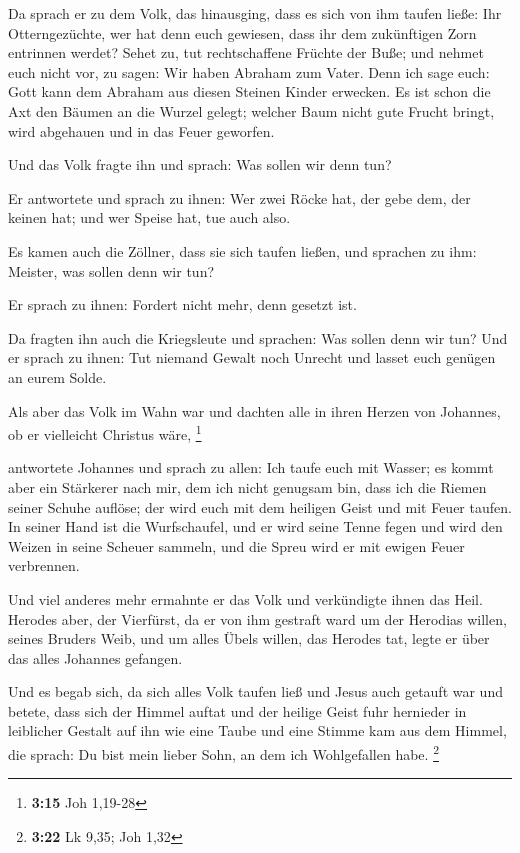  Da sprach er zu dem Volk, das hinausging, dass es sich
von ihm taufen ließe: Ihr Otterngezüchte, wer hat denn euch gewiesen,
dass ihr dem zukünftigen Zorn entrinnen werdet?  Sehet zu,
tut rechtschaffene Früchte der Buße; und nehmet euch nicht vor, zu
sagen: Wir haben Abraham zum Vater. Denn ich sage euch: Gott kann dem
Abraham aus diesen Steinen Kinder erwecken.  Es ist schon
die Axt den Bäumen an die Wurzel gelegt; welcher Baum nicht gute Frucht
bringt, wird abgehauen und in das Feuer geworfen.

 Und das Volk fragte ihn und sprach: Was sollen wir denn
tun?

 Er antwortete und sprach zu ihnen: Wer zwei Röcke hat,
der gebe dem, der keinen hat; und wer Speise hat, tue auch also.

 Es kamen auch die Zöllner, dass sie sich taufen ließen,
und sprachen zu ihm: Meister, was sollen denn wir tun?

 Er sprach zu ihnen: Fordert nicht mehr, denn gesetzt
ist.

 Da fragten ihn auch die Kriegsleute und sprachen: Was
sollen denn wir tun? Und er sprach zu ihnen: Tut niemand Gewalt noch
Unrecht und lasset euch genügen an eurem Solde.

 Als aber das Volk im Wahn war und dachten alle in ihren
Herzen von Johannes, ob er vielleicht Christus wäre, \footnote{\textbf{3:15}
  Joh 1,19-28}

 antwortete Johannes und sprach zu allen: Ich taufe euch
mit Wasser; es kommt aber ein Stärkerer nach mir, dem ich nicht genugsam
bin, dass ich die Riemen seiner Schuhe auflöse; der wird euch mit dem
heiligen Geist und mit Feuer taufen.  In seiner Hand ist
die Wurfschaufel, und er wird seine Tenne fegen und wird den Weizen in
seine Scheuer sammeln, und die Spreu wird er mit ewigen Feuer
verbrennen.

 Und viel anderes mehr ermahnte er das Volk und
verkündigte ihnen das Heil.  Herodes aber, der Vierfürst,
da er von ihm gestraft ward um der Herodias willen, seines Bruders Weib,
und um alles Übels willen, das Herodes tat,  legte er
über das alles Johannes gefangen.

 Und es begab sich, da sich alles Volk taufen ließ und
Jesus auch getauft war und betete, dass sich der Himmel auftat
 und der heilige Geist fuhr hernieder in leiblicher
Gestalt auf ihn wie eine Taube und eine Stimme kam aus dem Himmel, die
sprach: Du bist mein lieber Sohn, an dem ich Wohlgefallen habe.
\footnote{\textbf{3:22} Lk 9,35; Joh 1,32}

